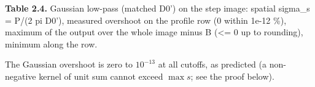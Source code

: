 \documentclass[10pt,a4paper]{article}
\begin{document}
\begin{table}[H]\centering\footnotesize{\small\textbf{Table 2.4.} Gaussian low-pass (matched D0') on the step image: spatial sigma\_s = P/(2 pi D0'), measured overshoot on the profile row (0 within 1e-12 \%), maximum of the output over the whole image minus B (\textless{}= 0 up to rounding), minimum along the row.\par}\vskip 3pt
\end{table}
The Gaussian overshoot is zero to $10^{-13}$ at all cutoffs, as predicted (a non-negative kernel of unit sum cannot exceed $\max s$; see the proof below).
\end{document}
